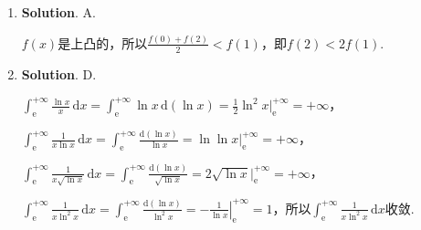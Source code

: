 \documentclass[../Main.tex]{subfiles}
\begin{document}
\begin{enumerate}
    \item \textbf{Solution}. A.

          $f(x)$是上凸的，所以$\frac{f(0)+f(2)}{2}<f(1)$，即$f(2)<2f(1)$.

    \item \textbf{Solution}. D.

          $\int_{\mathrm{e}}^{+\infty}\frac{\ln x}{x}\,\mathrm{d}x=\int_{\mathrm{e}}^{+\infty}
              \ln x\,\mathrm{d}(\ln x)=\frac{1}{2}\ln^{2} x\bigg|_{\mathrm{e}}^{+\infty}=+\infty$，

          $\int_{\mathrm{e}}^{+\infty}\frac{1}{x\ln x}\,\mathrm{d}x=\int_{\mathrm{e}}^{+\infty}
              \frac{\mathrm{d}(\ln x)}{\ln x}=\ln\ln x\bigg|_{\mathrm{e}}^{+\infty}=+\infty$，

          $\int_{\mathrm{e}}^{+\infty}\frac{1}{x\sqrt{\ln x}}\,\mathrm{d}x=\int_{\mathrm{e}}
              ^{+\infty}\frac{\mathrm{d}(\ln x)}{\sqrt{\ln x}}=2\sqrt{\ln x}\bigg|_{\mathrm{e}}
              ^{+\infty}=+\infty$，

          $\int_{\mathrm{e}}^{+\infty}\frac{1}{x\ln^{2} x}\,\mathrm{d}x=\int_{\mathrm{e}}
              ^{+\infty}\frac{\mathrm{d}(\ln x)}{\ln^{2} x}=\left.-\frac{1}{\ln x}\right|
              _{\mathrm{e}}^{+\infty}=1$，所以$\int_{\mathrm{e}}^{+\infty}\frac{1}{x\ln^{2}
                  x}\,\mathrm{d}x$收敛.
\end{enumerate}
\end{document}
